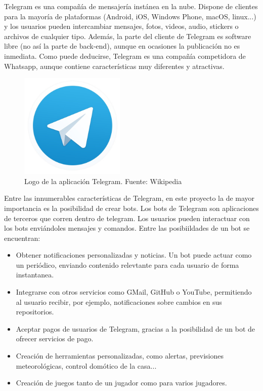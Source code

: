 Telegram es una compañía de mensajería instánea en la nube. Dispone de clientes para la mayoría de plataformas (Android, iOS, Windows Phone, macOS, linux...) y los usuarios pueden intercambiar mensajes, fotos, videos, audio, stickers o archivos de cualquier tipo. Además, la parte del cliente de Telegram es software libre (no así la parte de back-end), aunque en ocasiones la publicación no es inmediata. Como puede deducirse, Telegram es una compañía competidora de Whatsapp, aunque contiene características muy diferentes y atractivas.\\
\begin{figure}[H]
    \centering
    \captionsetup{width=7cm}
    \includegraphics[width=5cm]{contenido/imagenes/Telegram-logo.jpg}
    \caption{Logo de la aplicación Telegram. Fuente: Wikipedia \cite{wiki:telegramImage}}
\end{figure}
Entre las innumerables características de Telegram, en este proyecto la de mayor importancia es la posibilidad de crear bots. Los bots de Telegram son aplicaciones de terceros que corren dentro de telegram. Los usuarios pueden interactuar con los bots enviándoles mensajes y comandos. Entre las posibiildades de un bot se encuentran:
\begin{itemize}
    \item Obtener notificaciones personalizadas y noticias. Un bot puede actuar como un periódico, enviando contenido relevtante para cada usuario de forma instantanea.
    \item Integrarse con otros servicios como GMail, GitHub o YouTube, permitiendo al usuario recibir, por ejemplo, notificaciones sobre cambios en sus repositorios.
    \item Aceptar pagos de usuarios de Telegram, gracias a la posibilidad de un bot de ofrecer servicios de pago.
    \item Creación de herramientas personalizadas, como alertas, previsiones meteorológicas, control domótico de la casa...
    \item Creación de juegos tanto de un jugador como para varios jugadores.
\end{itemize}

